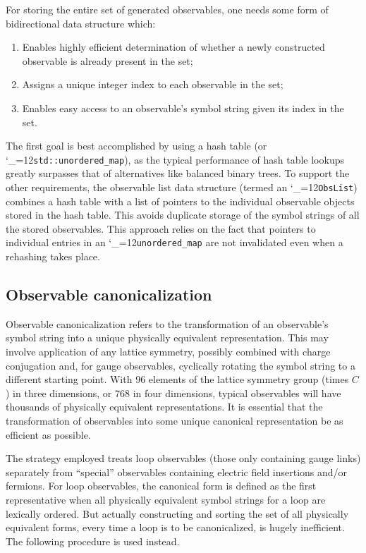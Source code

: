 \documentclass [12pt]{article}
\makeatletter
\renewcommand{\tt}{\begingroup\catcode`_=12\def\_{\string_}\tt@}
\newcommand{\tt@}[1]{\texttt{#1}\endgroup}
\makeatother
\begin{document}
For storing the entire set of generated observables,
one needs some form of bidirectional data structure which:
\begin{enumerate}\advance\itemsep -4pt
\item
    Enables highly efficient determination of whether a newly
    constructed observable is already present in the set;
\item
    Assigns a unique integer index to each observable in the set;
\item
    Enables easy access to an observable's symbol string given
    its index in the set.
\end{enumerate}
The first goal is best accomplished by using a hash table
(or \tt{std::unordered_map}), as the typical performance of
hash table lookups greatly surpasses that of alternatives like
balanced binary trees.
To support the other requirements, the observable list data structure
(termed an \tt{ObsList}) combines a hash table with a list of pointers
to the individual observable objects stored in the hash table.
This avoids duplicate storage of the symbol strings of all the
stored observables.
This approach relies on the fact that pointers to individual entries
in an \tt{unordered_map} are not invalidated even when a rehashing
takes place.

\subsection {Observable canonicalization}

Observable canonicalization refers to the
transformation of an observable's symbol string
into a unique physically equivalent representation.
This may involve application of any lattice symmetry,
possibly combined with charge conjugation and,
for gauge observables,
cyclically rotating the symbol string to a different
starting point.
With 96 elements of the lattice symmetry group (times $C$)
in three dimensions, or 768 in four dimensions,
typical observables will have
thousands of physically equivalent representations.
It is essential that the transformation of
observables into some unique canonical representation
be as efficient as possible.

The strategy employed treats loop observables
(those only containing gauge links)
separately from ``special'' observables containing
electric field insertions and/or fermions.
For loop observables,
the canonical form is defined as the first
representative when all physically equivalent
symbol strings for a loop are lexically ordered.
But actually constructing and sorting the set of 
all physically equivalent forms, every time a
loop is to be canonicalized, is hugely inefficient.
The following procedure is used instead.
\end{document}
